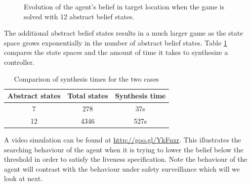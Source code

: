 \begin{figure}
\begin{minipage}{5.0cm}
	\end{minipage}
	
	
	\caption{Evolution of the agent's belief in target location when the game is solved with 12 abstract belief states.
	}
	\label{fig:case1fineexp}
	
\end{figure}




The additional abstract belief states results in a much larger game as the state space grows exponentially in the number of abstract belief states. Table \ref{tab:exp1} compares the state spaces and the amount of time it takes to synthesize a controller.


\begin{table}[h!]
	\centering
	\begin{tabular}{c|c|c}
		Abstract states & Total states & Synthesis time \\ \hline \hline
		7 & 278 & 37s \\ 
		12 & 4346 & 527s \\ 
	\end{tabular}\caption{Comparison of synthesis times for the two cases} \label{tab:exp1}
\end{table}


A video simulation can be found at \url{http://goo.gl/YkFuxr}. This illustrates the searching behaviour of the agent when it is trying to lower the belief below the threshold in order to satisfy the liveness specification. Note the behaviour of the agent will contrast with the behaviour under safety surveillance which will we look at next.

